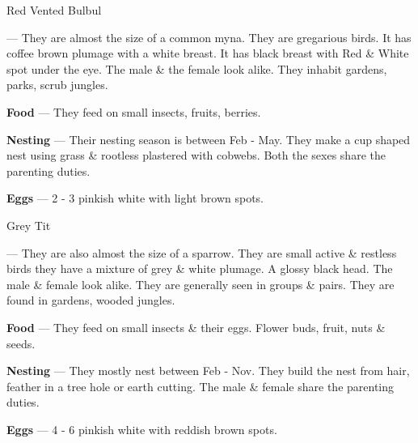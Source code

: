 \begin{bird}{Red Vented Bulbul}

 --- They are almost the size of a common myna. They are gregarious birds. It has coffee brown plumage with a white breast. It has black breast with Red \& White spot under the eye. The male \& the female look alike. They inhabit gardens, parks, scrub jungles.

{\large\bf Food} --- They feed on small insects, fruits, berries.

{\large\bf Nesting} --- Their nesting season is between Feb - May. They make a cup shaped nest using grass \& rootless plastered with cobwebs. Both the sexes share the parenting duties.

{\large\bf Eggs} --- 2 - 3 pinkish white with light brown spots.
\end{bird}

\begin{bird}{Grey Tit}

 --- They are also almost the size of a sparrow. They are small active \& restless birds they have a mixture of grey \& white plumage. A glossy black head. The male \& female look alike. They are generally seen in groups \& pairs. They are found in gardens, wooded jungles. 

{\large\bf Food} --- They feed on small insects \& their eggs. Flower buds, fruit, nuts \& seeds.

{\large\bf Nesting} --- They mostly nest between Feb - Nov. They build the nest from hair, feather in a tree hole or earth cutting. The male \& female share the parenting duties.

{\large\bf Eggs} --- 4 - 6 pinkish white with reddish brown spots.
\end{bird}

